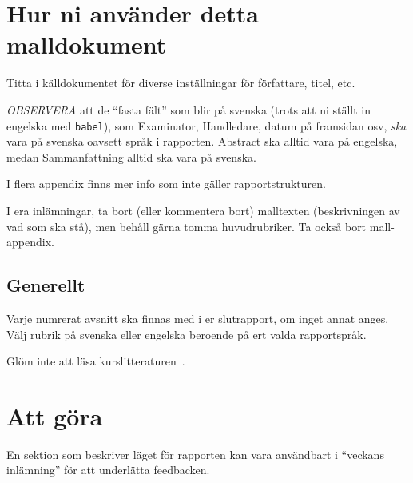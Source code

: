 \documentclass[a4paper,12pt]{article}
\begin{document}
\tableofcontents


\cleardoublepage


\mainmatter


\section*{Hur ni använder detta malldokument}
Titta i källdokumentet för diverse inställningar för författare, titel, etc.

\emph{OBSERVERA} att de ``fasta fält'' som blir på svenska (trots att ni ställt in engelska med \texttt{babel}), som Examinator, Handledare, datum på framsidan osv, \emph{ska} vara på svenska oavsett språk i rapporten. Abstract ska alltid vara på engelska, medan Sammanfattning alltid ska vara på svenska.

I flera appendix finns mer info som inte gäller rapportstrukturen.

I era inlämningar, ta bort (eller kommentera bort) malltexten (beskrivningen av vad som ska stå), men behåll gärna tomma huvudrubriker. Ta också bort mall-appendix.

\subsection*{Generellt}
Varje numrerat avsnitt ska finnas med i er slutrapport, om inget annat anges.
Välj rubrik på svenska eller engelska beroende på ert valda rapportspråk.

Glöm inte att läsa kurslitteraturen~\cite{dawson:projects-in-computing,dawson:projects-in-computing-old}.




\section*{Att göra}
En sektion som beskriver läget för rapporten kan vara användbart i ``veckans inlämning'' för att underlätta feedbacken.
\end{document}
